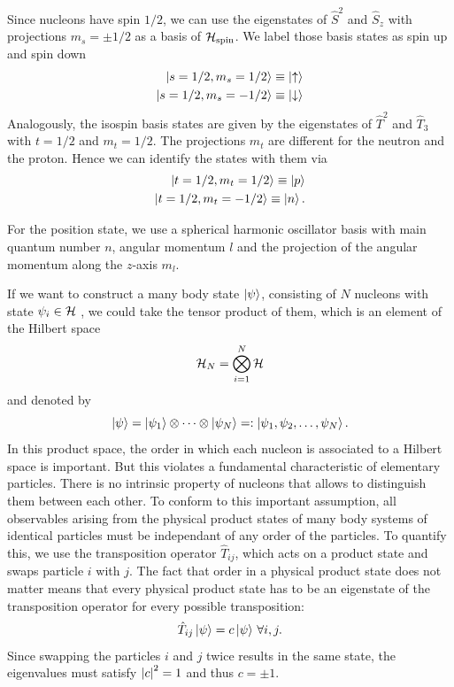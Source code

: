 Since nucleons have spin $1/2$, we can use the eigenstates of $\hat{S}^2$ and $\hat{S}_z$ with projections $m_s = \pm1/2$ as a basis of $\mathcal{H}_\mathrm{spin}$. We label those basis states as spin up and spin down
\begin{align}
  \ket{s=1/2, m_s =  1/2} \equiv \ket{\uparrow} \\
  \ket{s=1/2, m_s = - 1/2} \equiv \ket{\downarrow}
\end{align}
Analogously, the isospin basis states are given by the eigenstates of $\hat{T}^2$ and $\hat{T}_3$ with $t=1/2$ and $m_t=1/2$. The projections $m_t$ are different for the neutron and the proton. Hence we can identify the states with them via
\begin{align}
  \ket{t=1/2, m_t =  1/2} \equiv \ket{p} \\
  \ket{t=1/2, m_t = - 1/2} \equiv \ket{n}.
\end{align}

For the position state, we use a spherical harmonic oscillator basis with main quantum number $n$, angular momentum $l$ and the projection of the angular momentum along the $z$-axis $m_l$.

If we want to construct a many body state $\ket{\psi}$, consisting of $N$ nucleons with state $\psi_i \in \mathcal{H}$ , we could take the tensor product of them, which is an element of the Hilbert space
\begin{equation}
  \mathcal{H}_N = \bigotimes_{i=1}^{N} \mathcal{H}
\end{equation}
and denoted by
\begin{equation}
  \ket{\psi} = \ket{\psi_1} \otimes \dots \otimes \ket{\psi_N} =: \ket{\psi_1, \psi_2, \dots, \psi_N}.
\end{equation}
In this product space, the order in which each nucleon is associated to a Hilbert space is important. But this violates a fundamental characteristic of elementary particles. There is no intrinsic property of nucleons that allows to distinguish them between each other. To conform to this important assumption, all observables arising from the physical product states of many body systems of identical particles must be independant of any order of the particles. To quantify this, we use the transposition operator $\hat{T}_{ij}$, which acts on a product state and swaps particle $i$ with $j$. The fact that order in a physical product state does not matter means that every physical product state has to be an eigenstate of the transposition operator for every possible transposition:
\begin{equation}
  \hat{T}_{ij}\ket\psi = c\ket\psi \, \forall i,j.
\end{equation}
Since swapping the particles $i$ and $j$ twice results in the same state, the eigenvalues must satisfy $\left\lvert c\right\rvert^2 = 1$ and thus $c = \pm 1$.

